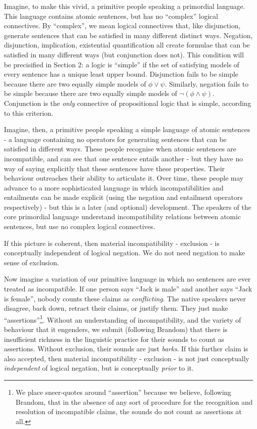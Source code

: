 Imagine, to make this vivid, a primitive people speaking a
primordial language.  This language contains atomic sentences, but has
no ``complex'' logical connectives.  By ``complex'', we mean logical
connectives that, like disjunction, generate sentences that can be
satisfied in many different distinct ways.  Negation, disjunction,
implication, existential quantification all create formulae that can
be satisfied in many different ways (but conjunction does not). This condition will be
precisified in Section 2: a logic is ``simple'' if the set of
satisfying models of every sentence has a unique least upper
bound. Disjunction fails to be simple because there are two equally
simple models of $\phi \lor \psi$. Similarly, negation fails to be simple
because there are two equally simple models of $\neg (\phi \land
\psi)$. Conjunction is the \emph{only} connective of propositional logic that is simple,
according to this criterion.

Imagine, then, a primitive people speaking a simple language of
atomic sentences - a language containing no operators for generating
sentences that can be satisfied in different ways.  These people
recognise when atomic sentences are incompatible, and can see that one
sentence entails another - but they have no way of saying explicitly
that these sentences have these properties.  Their behaviour
outreaches their ability to articulate it.  Over time, these people
may advance to a more sophisticated language in which
incompatibilities and entailments can be made explicit (using the
negation and entailment operators respectively) - but this is a later
(and optional) development. The speakers of the core primordial
language understand incompatibility relations between atomic
sentences, but use no complex logical connectives.

If this picture is coherent, then material incompatibility - exclusion - is conceptually independent of logical negation.
We do not need negation to make sense of exclusion.

Now imagine a variation of our primitive language in which no sentences are ever treated as incompatible.
If one person says ``Jack is male'' and another says ``Jack is female'', nobody counts these claims as \emph{conflicting}. 
The native speakers never disagree, back down, retract their claims, or justify them. They just make ``assertions''\footnote{We place sneer-quotes around ``assertion'' because we believe, following Brandom, that in the absence of any sort of procedure for the recognition and resolution of incompatible claims, the sounds do not count as assertions at all.}.
Without an understanding of incompatibility, and the variety of behaviour that it engenders, we submit (following Brandom) that there is insufficient richness in the linguistic practice for their sounds to count as assertions.
Without exclusion, their sounds are just \emph{barks}.
If this further claim is also accepted, then material incompatibility - exclusion - is not just conceptually \emph{independent} of logical negation, but is conceptually \emph{prior} to it.

